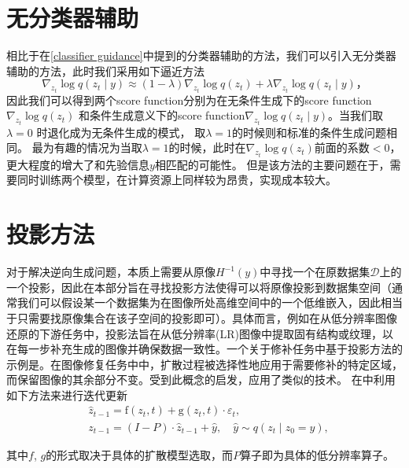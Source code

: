 \section{无分类器辅助}
相比于在\ref{classifier guidance}中提到的分类器辅助的方法，我们可以引入无分类器辅助的方法，此时我们采用如下逼近方法
\begin{equation}
    \nabla_{{z}_t} \log q\left({z}_t \mid y\right)\approx (1-\lambda)\nabla_{{z}_t} \log q\left({z}_t\right)+\lambda \nabla_{{z}_t} \log q\left( {z}_t \mid y \right)，
\end{equation}
因此我们可以得到两个score function分别为在无条件生成下的score function $\nabla_{{z}_t} \log q\left({z}_t\right)$ 和条件生成意义下的score function$\nabla_{{z}_t} \log q\left( {z}_t \mid y \right)$。当我们取$\lambda=0$ 时退化成为无条件生成的模式， 取$\lambda=1$的时候则和标准的条件生成问题相同。 最为有趣的情况为当取$\lambda=1$的时候，此时在$\nabla_{{z}_t} \log q\left({z}_t\right)$前面的系数$<0$，更大程度的增大了和先验信息$y$相匹配的可能性。 但是该方法的主要问题在于，需要同时训练两个模型，在计算资源上同样较为昂贵，实现成本较大。 

\section{投影方法}
\label{projection based}
对于解决逆向生成问题，本质上需要从原像$H^{-1}(y)$中寻找一个在原数据集$\mathcal{D}$上的一个投影，因此在本部分旨在寻找投影方法使得可以将原像投影到数据集空间（通常我们可以假设某一个数据集为在图像所处高维空间中的一个低维嵌入，因此相当于只需要找原像集合在该子空间的投影即可）。具体而言，例如在从低分辨率图像还原的下游任务中，投影法旨在从低分辨率(LR)图像中提取固有结构或纹理，以在每一步补充生成的图像并确保数据一致性。一个关于修补任务中基于投影方法的示例是\cite{PnP}。在图像修复任务中中，扩散过程被选择性地应用于需要修补的特定区域，而保留图像的其余部分不变。受到此概念的启发，\cite{red_diff}应用了类似的技术。 
在\cite{MCG}中利用如下方法来进行迭代更新
\begin{align} & \hat{{z}}_{t-1}=\mathrm{f}\left({z}_t, t\right)+\mathrm{g}\left({z}_t, t\right) \cdot \varepsilon_t, \\ & {z}_{t-1}=({I}-{P}) \cdot \hat{{z}}_{t-1}+\hat{{y}}, \quad \hat{{y}} \sim q\left({z}_t \mid {z}_0=y\right),\end{align}

其中$f$, $g$的形式取决于具体的扩散模型选取，而$P$算子即为具体的低分辨率算子。

